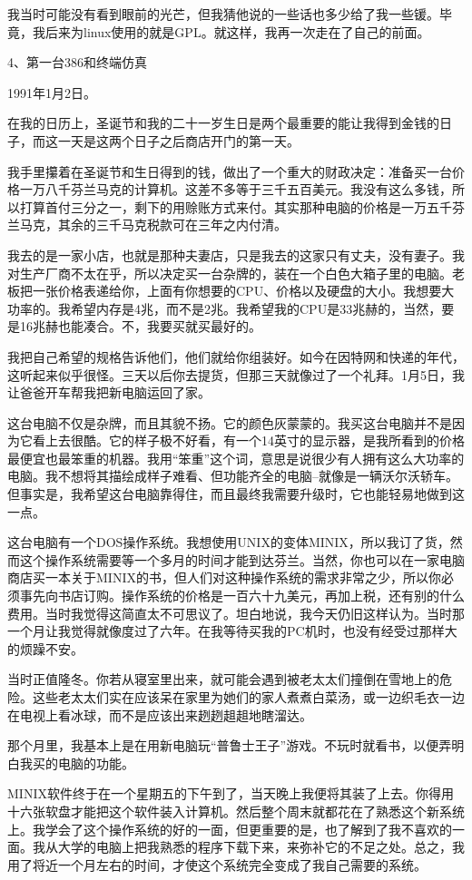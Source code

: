 我当时可能没有看到眼前的光芒，但我猜他说的一些话也多少给了我一些锾。毕竟，我后来为linux使用的就是GPL。就这样，我再一次走在了自己的前面。

 
4、第一台386和终端仿真

1991年1月2日。

在我的日历上，圣诞节和我的二十一岁生日是两个最重要的能让我得到金钱的日子，而这一天是这两个日子之后商店开门的第一天。

我手里攥着在圣诞节和生日得到的钱，做出了一个重大的财政决定：准备买一台价格一万八千芬兰马克的计算机。这差不多等于三千五百美元。我没有这么多钱，所以打算首付三分之一，剩下的用赊账方式来付。其实那种电脑的价格是一万五千芬兰马克，其余的三千马克税款可在三年之内付清。

我去的是一家小店，也就是那种夫妻店，只是我去的这家只有丈夫，没有妻子。我对生产厂商不太在乎，所以决定买一台杂牌的，装在一个白色大箱子里的电脑。老板把一张价格表递给你，上面有你想要的CPU、价格以及硬盘的大小。我想要大功率的。我希望内存是4兆，而不是2兆。我希望我的CPU是33兆赫的，当然，要是16兆赫也能凑合。不，我要买就买最好的。

我把自己希望的规格告诉他们，他们就给你组装好。如今在因特网和快递的年代，这听起来似乎很怪。三天以后你去提货，但那三天就像过了一个礼拜。1月5日，我让爸爸开车帮我把新电脑运回了家。

这台电脑不仅是杂牌，而且其貌不扬。它的颜色灰蒙蒙的。我买这台电脑并不是因为它看上去很酷。它的样子极不好看，有一个14英寸的显示器，是我所看到的价格最便宜也最笨重的机器。我用“笨重”这个词，意思是说很少有人拥有这么大功率的电脑。我不想将其描绘成样子难看、但功能齐全的电脑--就像是一辆沃尔沃轿车。但事实是，我希望这台电脑靠得住，而且最终我需要升级时，它也能轻易地做到这一点。

这台电脑有一个DOS操作系统。我想使用UNIX的变体MINIX，所以我订了货，然而这个操作系统需要等一个多月的时间才能到达芬兰。当然，你也可以在一家电脑商店买一本关于MINIX的书，但人们对这种操作系统的需求非常之少，所以你必须事先向书店订购。操作系统的价格是一百六十九美元，再加上税，还有别的什么费用。当时我觉得这简直太不可思议了。坦白地说，我今天仍旧这样认为。当时那一个月让我觉得就像度过了六年。在我等待买我的PC机时，也没有经受过那样大的烦躁不安。

当时正值隆冬。你若从寝室里出来，就可能会遇到被老太太们撞倒在雪地上的危险。这些老太太们实在应该呆在家里为她们的家人煮煮白菜汤，或一边织毛衣一边在电视上看冰球，而不是应该出来趔趔趄趄地瞎溜达。

那个月里，我基本上是在用新电脑玩“普鲁士王子”游戏。不玩时就看书，以便弄明白我买的电脑的功能。

MINIX软件终于在一个星期五的下午到了，当天晚上我便将其装了上去。你得用十六张软盘才能把这个软件装入计算机。然后整个周末就都花在了熟悉这个新系统上。我学会了这个操作系统的好的一面，但更重要的是，也了解到了我不喜欢的一面。我从大学的电脑上把我熟悉的程序下载下来，来弥补它的不足之处。总之，我用了将近一个月左右的时间，才使这个系统完全变成了我自己需要的系统。

